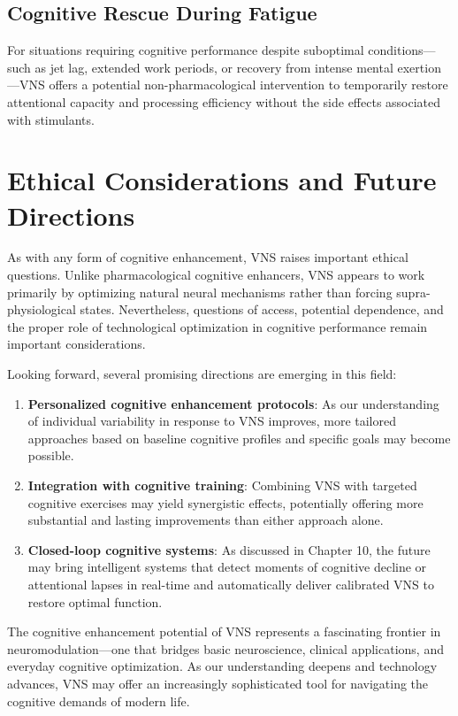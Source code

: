 \documentclass[
  Letterpaper,
]{scrbook}
\begin{document}
\subsection{Cognitive Rescue During
Fatigue}\label{cognitive-rescue-during-fatigue}

For situations requiring cognitive performance despite suboptimal
conditions---such as jet lag, extended work periods, or recovery from
intense mental exertion---VNS offers a potential non-pharmacological
intervention to temporarily restore attentional capacity and processing
efficiency without the side effects associated with stimulants.

\section{Ethical Considerations and Future
Directions}\label{ethical-considerations-and-future-directions}

As with any form of cognitive enhancement, VNS raises important ethical
questions. Unlike pharmacological cognitive enhancers, VNS appears to
work primarily by optimizing natural neural mechanisms rather than
forcing supra-physiological states. Nevertheless, questions of access,
potential dependence, and the proper role of technological optimization
in cognitive performance remain important considerations.

Looking forward, several promising directions are emerging in this
field:

\begin{enumerate}
\def\labelenumi{\arabic{enumi}.}
\item
  \textbf{Personalized cognitive enhancement protocols}: As our
  understanding of individual variability in response to VNS improves,
  more tailored approaches based on baseline cognitive profiles and
  specific goals may become possible.
\item
  \textbf{Integration with cognitive training}: Combining VNS with
  targeted cognitive exercises may yield synergistic effects,
  potentially offering more substantial and lasting improvements than
  either approach alone.
\item
  \textbf{Closed-loop cognitive systems}: As discussed in Chapter 10,
  the future may bring intelligent systems that detect moments of
  cognitive decline or attentional lapses in real-time and automatically
  deliver calibrated VNS to restore optimal function.
\end{enumerate}

The cognitive enhancement potential of VNS represents a fascinating
frontier in neuromodulation---one that bridges basic neuroscience,
clinical applications, and everyday cognitive optimization. As our
understanding deepens and technology advances, VNS may offer an
increasingly sophisticated tool for navigating the cognitive demands of
modern life.
\end{document}
